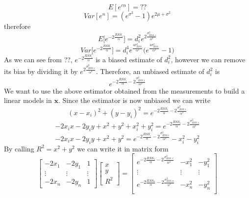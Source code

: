\documentclass[12pt]{report}
\begin{document}
\begin{equation}
    E[e^{cn}]=??
\end{equation}
\begin{equation}
Var[e^n]=(e^{\sigma^2}-1)e^{2\mu+\sigma^2}    
\end{equation}
therefore 
\begin{equation}
E\bigg[e^{-2\frac{RSS_i}{\alpha}}\bigg]=d_i^2e^{2\frac{\sigma^2_{RSS,i}}{\alpha^2}}
\end{equation}
\begin{equation}
    Var\bigg[e^{-2\frac{RSS_i}{\alpha}}\bigg]=d_i^4e^{\frac{4\sigma_{RSS_i}^2}{\alpha^2}}\bigg(e^{\frac{4\sigma_{RSS_i}^2}{\alpha^2}}-1\bigg)
\end{equation}
As we can see from ??, $e^{-2\frac{RSS_i}{\alpha}}$ is a biased estimate of $d_i^2$, however we can remove its bias by dividing it by $e^{2\frac{\sigma^2_{RSS,i}}{\alpha^2}}$. Therefore, an unbiased estimate of $d_i^2$ is 
\begin{equation}
    e^{-2\frac{RSS_i}{\alpha}-2\frac{\sigma^2_{RSS,i}}{\alpha^2}}
\end{equation}
We want to use the above estimator obtained from the measurements to build a linear models in $\mathbf{x}$. Since the estimator is now unbiased we can write
\begin{equation}
    (x-x_i)^2+(y-y_i)^2=e^{-2\frac{RSS_i}{\alpha}-2\frac{\sigma^2_{RSS,i}}{\alpha^2}}
\end{equation}
\begin{equation}
    -2x_ix-2y_iy+x^2+y^2+x_i^2+y_i^2=e^{-2\frac{RSS_i}{\alpha}-2\frac{\sigma^2_{RSS,i}}{\alpha^2}}
\end{equation}
\begin{equation}
    -2x_ix-2y_iy+x^2+y^2=e^{-2\frac{RSS_i}{\alpha}-2\frac{\sigma^2_{RSS,i}}{\alpha^2}}-x_i^2-y_i^2
\end{equation}
By calling $R^2=x^2+y^2$ we can write it in matrix form
\begin{equation}
    \begin{bmatrix}
        -2x_1 & -2y_1 & 1\\
        \vdots&\vdots&\vdots\\
        -2x_n & -2y_n & 1
    \end{bmatrix}
    \begin{bmatrix}
        x\\
        y\\
        R^2
    \end{bmatrix} = 
    \begin{bmatrix}
        e^{-2\frac{RSS_1}{\alpha}-2\frac{\sigma^2_{RSS,1}}{\alpha^2}} & -x_1^2 & -y_1^2\\
        \vdots&\vdots&\vdots\\
        e^{-2\frac{RSS_n}{\alpha}-2\frac{\sigma^2_{RSS,n}}{\alpha^2}} & -x_n^2 & -y_n^2\\
    \end{bmatrix}
\end{equation}
\end{document}
